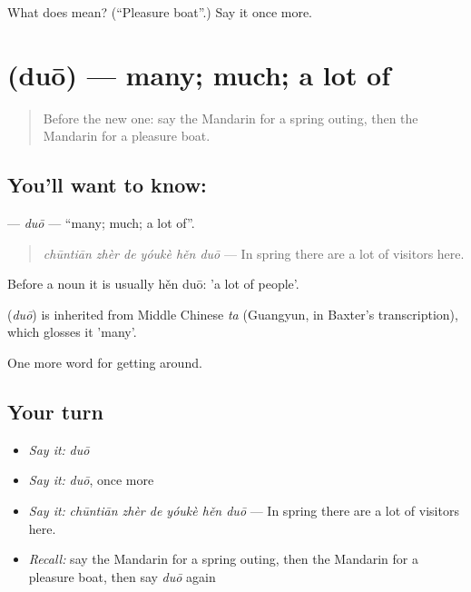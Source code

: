 \begin{tcolorbox}[breakable,colback=teal!4,colframe=teal!35!black,title={Before you move on}]
What does  mean? (\textquotedblleft{}Pleasure boat\textquotedblright{}.) Say it once more.
\end{tcolorbox}
\section[\texorpdfstring{\zh{多} (duō)}{多 (duō)}]{ (duō) — many; much; a lot of}

\label{lesson:ZH-C431-duo}



\begin{quote}
Before the new one: say the Mandarin for a spring outing, then the Mandarin for a pleasure boat.
\end{quote}

\subsection*{You'll want to know: }
\textbf{} — \emph{duō} — \textquotedblleft{}many; much; a lot of\textquotedblright{}.

\begin{quote}
\textbf{} \emph{chūntiān zhèr de yóukè hěn duō} — In spring there are a lot of visitors here.
\end{quote}

Before a noun it is usually  hěn duō:  'a lot of people'.

\begin{cousinweb}
\textbf{} (\emph{duō}) is inherited from Middle Chinese \emph{ta} (Guangyun, in Baxter's transcription), which glosses it 'many'.
\end{cousinweb}

\begin{grammarlens}[title={What you've built}]
One more word for getting around.
\end{grammarlens}

\subsection*{Your turn}
\begin{itemize}
\raggedright
  \item \emph{Say it:} \emph{duō}
  \item \emph{Say it:} \emph{duō}, once more
  \item \emph{Say it:} \emph{chūntiān zhèr de yóukè hěn duō} — In spring there are a lot of visitors here.
  \item \emph{Recall:} say the Mandarin for a spring outing, then the Mandarin for a pleasure boat, then say \emph{duō} again
\end{itemize}

